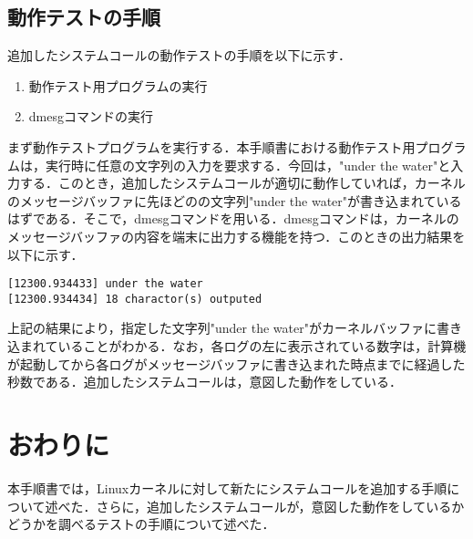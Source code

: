 \documentclass[12pt]{jsarticle}
\begin{document}
\subsection{動作テストの手順}
追加したシステムコールの動作テストの手順を以下に示す．
\begin{enumerate}
\item 動作テスト用プログラムの実行
\item dmesgコマンドの実行
\end{enumerate}
まず動作テストプログラムを実行する．本手順書における動作テスト用プログラムは，実行時に任意の文字列の入力を要求する．今回は，"under the water"と入力する．このとき，追加したシステムコールが適切に動作していれば，カーネルのメッセージバッファに先ほどのの文字列"under the water"が書き込まれているはずである．そこで，dmesgコマンドを用いる．dmesgコマンドは，カーネルのメッセージバッファの内容を端末に出力する機能を持つ．このときの出力結果を以下に示す．
\begin{verbatim}
[12300.934433] under the water
[12300.934434] 18 charactor(s) outputed
\end{verbatim}
上記の結果により，指定した文字列"under the water"がカーネルバッファに書き込まれていることがわかる．なお，各ログの左に表示されている数字は，計算機が起動してから各ログがメッセージバッファに書き込まれた時点までに経過した秒数である．追加したシステムコールは，意図した動作をしている．
\section{おわりに}
本手順書では，Linuxカーネルに対して新たにシステムコールを追加する手順について述べた．さらに，追加したシステムコールが，意図した動作をしているかどうかを調べるテストの手順について述べた．



\begin{thebibliography}{1}
\end{thebibliography}
\end{document}
